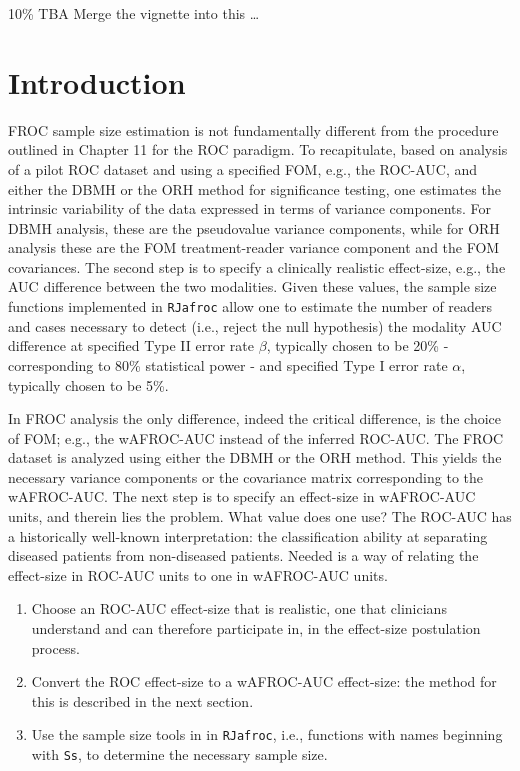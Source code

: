 \documentclass[
]{book}
\providecommand{\tightlist}{%
  \setlength{\itemsep}{0pt}\setlength{\parskip}{0pt}}
\begin{document}
10\%
TBA Merge the vignette into this \ldots{}

\hypertarget{froc-sample-size-intro}{%
\section{Introduction}\label{froc-sample-size-intro}}

FROC sample size estimation is not fundamentally different from the procedure outlined in Chapter 11 for the ROC paradigm. To recapitulate, based on analysis of a pilot ROC dataset and using a specified FOM, e.g., the ROC-AUC, and either the DBMH or the ORH method for significance testing, one estimates the intrinsic variability of the data expressed in terms of variance components. For DBMH analysis, these are the pseudovalue variance components, while for ORH analysis these are the FOM treatment-reader variance component and the FOM covariances. The second step is to specify a clinically realistic effect-size, e.g., the AUC difference between the two modalities. Given these values, the sample size functions implemented in \texttt{RJafroc} allow one to estimate the number of readers and cases necessary to detect (i.e., reject the null hypothesis) the modality AUC difference at specified Type II error rate \(\beta\), typically chosen to be 20\% - corresponding to 80\% statistical power - and specified Type I error rate \(\alpha\), typically chosen to be 5\%.

In FROC analysis the only difference, indeed the critical difference, is the choice of FOM; e.g., the wAFROC-AUC instead of the inferred ROC-AUC. The FROC dataset is analyzed using either the DBMH or the ORH method. This yields the necessary variance components or the covariance matrix corresponding to the wAFROC-AUC. The next step is to specify an effect-size in wAFROC-AUC units, and therein lies the problem. What value does one use? The ROC-AUC has a historically well-known interpretation: the classification ability at separating diseased patients from non-diseased patients. Needed is a way of relating the effect-size in ROC-AUC units to one in wAFROC-AUC units.

\begin{enumerate}
\def\labelenumi{\arabic{enumi}.}
\tightlist
\item
  Choose an ROC-AUC effect-size that is realistic, one that clinicians understand and can therefore participate in, in the effect-size postulation process.
\item
  Convert the ROC effect-size to a wAFROC-AUC effect-size: the method for this is described in the next section.
\item
  Use the sample size tools in in \texttt{RJafroc}, i.e., functions with names beginning with \texttt{Ss}, to determine the necessary sample size.
\end{enumerate}
\end{document}
